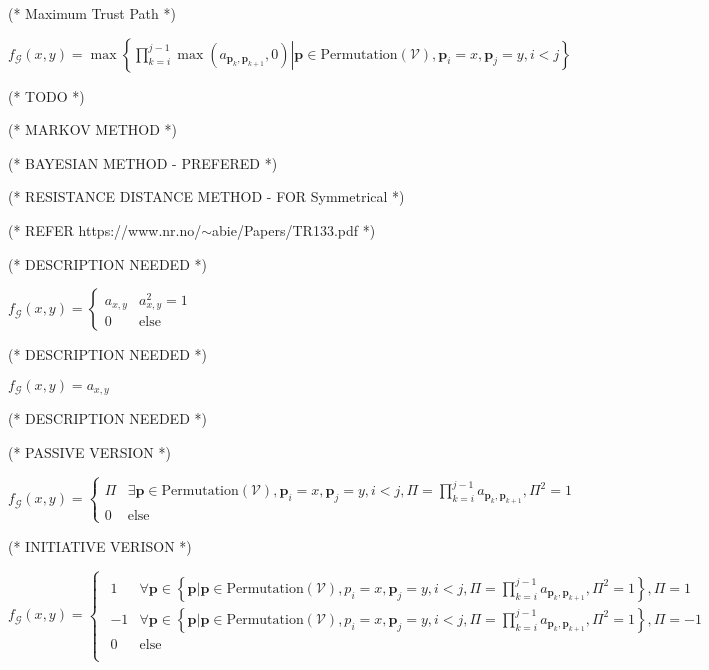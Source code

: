 \documentclass{article}
\begin{document}
(* Maximum Trust Path *)

\(f_{\mathcal{G}}(x,y)=\max \left\{\left.\prod _{k=i}^{j-1} \max \left(a_{\pmb{p}_k,\pmb{p}_{k+1}},0\right)\right|\pmb{p}\in \text{Permutation}(\mathcal{V}),\pmb{p}_i=x,\pmb{p}_j=y,i<j\right\}\)



(* TODO *)



(* MARKOV METHOD *)



(* BAYESIAN METHOD - PREFERED *)



(* RESISTANCE DISTANCE METHOD - FOR Symmetrical *)



(* REFER https://www.nr.no/$\sim $abie/Papers/TR133.pdf *)





(* DESCRIPTION NEEDED *)

\(f_{\mathcal{G}}(x,y)=\begin{cases}
 a_{x,y} & a_{x,y}^2=1 \\
 0 & \text{else}
\end{cases}\)





(* DESCRIPTION NEEDED *)

\(f_{\mathcal{G}}(x,y)=a_{x,y}\)





(* DESCRIPTION NEEDED *)



(* PASSIVE VERSION *)

\(f_{\mathcal{G}}(x,y)=\begin{cases}
 \Pi  & \exists \pmb{p}\in \text{Permutation}(\mathcal{V}),\pmb{p}_i=x,\pmb{p}_j=y,i<j,\Pi =\prod _{k=i}^{j-1} a_{\pmb{p}_k,\pmb{p}_{k+1}},\Pi ^2=1
\\
 0 & \text{else}
\end{cases}\)



(* INITIATIVE VERISON *)





\(f_{\mathcal{G}}(x,y)=\begin{cases}
 
\begin{array}{ll}
 1 & \forall \pmb{p}\in \left\{\pmb{p}|\pmb{p}\in \text{Permutation}(\mathcal{V}),p_i=x,\pmb{p}_j=y,i<j,\Pi =\prod _{k=i}^{j-1} a_{\pmb{p}_k,\pmb{p}_{k+1}},\Pi
^2=1\right\},\Pi =1 \\
 -1 & \forall \pmb{p}\in \left\{\pmb{p}|\pmb{p}\in \text{Permutation}(\mathcal{V}),p_i=x,\pmb{p}_j=y,i<j,\Pi =\prod _{k=i}^{j-1} a_{\pmb{p}_k,\pmb{p}_{k+1}},\Pi
^2=1\right\},\Pi =-1 \\
 0 & \text{else} \\
\end{array}

\end{cases}\)
\end{document}
